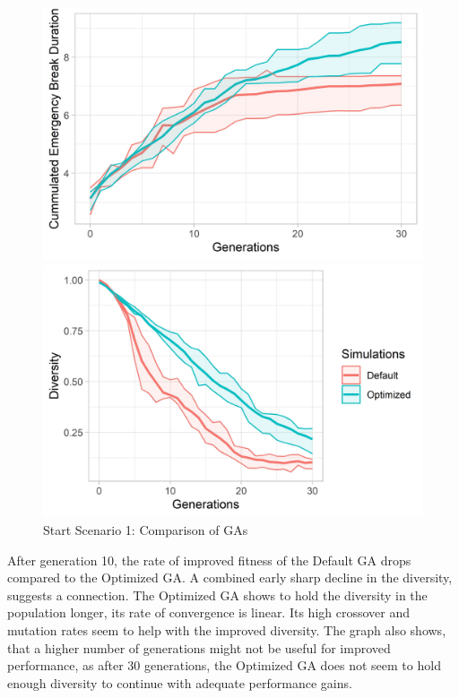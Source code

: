 \begin{figure}[ht] 
	\label{figure:sim_1_ga_comparison}
	\begin{minipage}[b]{0.5\linewidth}
		\centering
		\includegraphics[width=1\linewidth]{simulations/evaluation/plots/sim_1_ga_generations} 
	\end{minipage}%
	\begin{minipage}[b]{0.5\linewidth}
		\centering
		\includegraphics[width=1\linewidth]{simulations/evaluation/plots/sim_1_ga_diversity} 
	\end{minipage} 
	\caption{Start Scenario 1: Comparison of GAs}
\end{figure}

After generation 10, the rate of improved fitness of the Default GA drops compared to the Optimized GA. A combined early sharp decline in the diversity, suggests a connection. The Optimized GA shows to hold the diversity in the population longer, its rate of convergence is linear. Its high crossover and mutation rates seem to help with the improved diversity. The graph also shows, that a higher number of generations might not be useful for improved performance, as after 30 generations, the Optimized GA does not seem to hold enough diversity to continue with adequate performance gains. 

